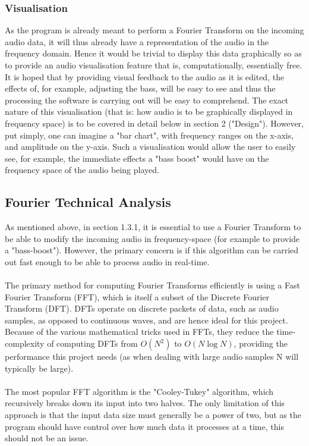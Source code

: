 \subsubsection{Visualisation}
As the program is already meant to perform a Fourier Transform on the incoming audio data, it will thus already have a representation of the audio in the frequency domain. Hence it would be trivial to display this data graphically so as to provide an audio visualisation feature that is, computationally, essentially free. It is hoped that by providing visual feedback to the audio as it is edited, the effects of, for example, adjusting the bass, will be easy to see and thus the processing the software is carrying out will be easy to comprehend. The exact nature of this visualisation (that is: how audio is to be graphically displayed in frequency space) is to be covered in detail below in section 2 ("Design"). However, put simply, one can imagine  a "bar chart", with frequency ranges on the x-axis, and amplitude on the y-axis. Such a visualisation would allow the user to easily see, for example, the immediate effects a "bass boost" would have on the frequency space of the audio being played.

\pagebreak
\subsection{Fourier Technical Analysis}
As mentioned above, in section 1.3.1, it is essential to use a Fourier Transform to be able to modify the incoming audio in frequency-space (for example to provide a "bass-boost"). However, the primary concern is if this algorithm can be carried out fast enough to be able to process audio in real-time.

\paragraph{}
The primary method for computing Fourier Transforms efficiently is using a Fast Fourier Transform (FFT), which is itself a subset of the Discrete Fourier Transform (DFT). DFTs operate on discrete packets of data, such as audio samples, as opposed to continuous waves, and are hence ideal for this project. Because of the various mathematical tricks used in FFTs, they reduce the time-complexity of computing DFTs from \(O(N^2)\) to \(O(N\log{N})\), providing the performance this project needs (as when dealing with large audio samples N will typically be large).

\paragraph{}
The most popular FFT algorithm is the "Cooley-Tukey" algorithm, which recursively breaks down its input into two halves. The only limitation of  this approach is that the input data size must generally be a power of two, but as the program should have control over how much data it processes at a time, this should not be an issue.

